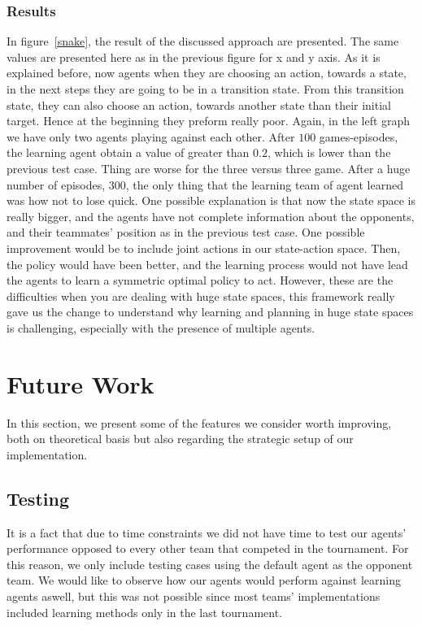 \documentclass[conference]{IEEEtran}
\begin{document}
\subsubsection{Results}
In figure~\ref{snake}, the result of the discussed approach are presented. The same values are presented here as in the previous figure for x and y axis. As it is explained before, now agents when they are choosing an action, towards a state, in the next steps they are going to be in a transition state. From this transition state, they can also choose an action, towards another state than their initial target. Hence at the beginning they preform really poor. Again, in the left graph we have only two agents playing against each other. After $100$ games-episodes, the learning agent obtain a value of greater than $0.2$, which is lower than the previous test case. Thing are worse for the three versus three game. After a huge number of episodes, $300$, the only thing that the learning team of agent learned was how not to lose quick. One possible explanation is that now the state space is really bigger, and the agents have not complete information about the opponents, and their teammates' position as in the previous test case. One possible improvement would be to include joint actions in our state-action space. Then, the policy would have been better, and the learning process would not have lead the agents to learn a symmetric optimal policy to act. However, these are the difficulties when you are dealing with huge state spaces, this framework really gave us the change to understand why learning and planning in huge state spaces is challenging, especially with the presence of multiple agents.


\section{Future Work}

In this section, we present some of the features we consider worth improving, both on theoretical basis but also regarding the strategic setup of our implementation.

\subsection{Testing}
It is a fact that due to time constraints we did not have time to test our agents' performance opposed to every other team that competed in the tournament. For this reason, we only include testing cases using the default agent as the opponent team. We would like to observe how our agents would perform against learning agents aswell, but this was not possible since most teams' implementations included learning methods only in the last tournament.
\end{document}
